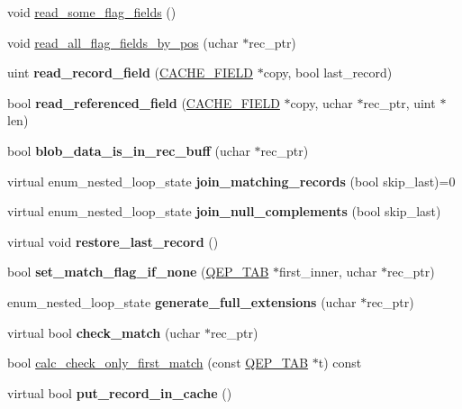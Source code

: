 \begin{DoxyCompactItemize}
void \mbox{\hyperlink{group__Query__Optimizer_gafa19cecc5eccee0ff1285c62769daf39}{read\+\_\+some\+\_\+flag\+\_\+fields}} ()
\item 
void \mbox{\hyperlink{group__Query__Optimizer_ga812222f5f9eb4a9026c8ce89069ef8d7}{read\+\_\+all\+\_\+flag\+\_\+fields\+\_\+by\+\_\+pos}} (uchar $\ast$rec\+\_\+ptr)
\item 
uint {\bfseries read\+\_\+record\+\_\+field} (\mbox{\hyperlink{structst__cache__field}{C\+A\+C\+H\+E\+\_\+\+F\+I\+E\+LD}} $\ast$copy, bool last\+\_\+record)
\item 
bool {\bfseries read\+\_\+referenced\+\_\+field} (\mbox{\hyperlink{structst__cache__field}{C\+A\+C\+H\+E\+\_\+\+F\+I\+E\+LD}} $\ast$copy, uchar $\ast$rec\+\_\+ptr, uint $\ast$len)
\item 
\mbox{\label{classJOIN__CACHE_a25358a8afe91adf6aceb43f246d82b36}} 
bool {\bfseries blob\+\_\+data\+\_\+is\+\_\+in\+\_\+rec\+\_\+buff} (uchar $\ast$rec\+\_\+ptr)
\item 
\mbox{\label{classJOIN__CACHE_a85d4345aed8f6ab7651f8cc0e228b307}} 
virtual enum\+\_\+nested\+\_\+loop\+\_\+state {\bfseries join\+\_\+matching\+\_\+records} (bool skip\+\_\+last)=0
\item 
virtual enum\+\_\+nested\+\_\+loop\+\_\+state {\bfseries join\+\_\+null\+\_\+complements} (bool skip\+\_\+last)
\item 
virtual void {\bfseries restore\+\_\+last\+\_\+record} ()
\item 
bool {\bfseries set\+\_\+match\+\_\+flag\+\_\+if\+\_\+none} (\mbox{\hyperlink{classQEP__TAB}{Q\+E\+P\+\_\+\+T\+AB}} $\ast$first\+\_\+inner, uchar $\ast$rec\+\_\+ptr)
\item 
enum\+\_\+nested\+\_\+loop\+\_\+state {\bfseries generate\+\_\+full\+\_\+extensions} (uchar $\ast$rec\+\_\+ptr)
\item 
virtual bool {\bfseries check\+\_\+match} (uchar $\ast$rec\+\_\+ptr)
\item 
bool \mbox{\hyperlink{group__Query__Optimizer_ga680b1522161dd38adbc48197df3ea115}{calc\+\_\+check\+\_\+only\+\_\+first\+\_\+match}} (const \mbox{\hyperlink{classQEP__TAB}{Q\+E\+P\+\_\+\+T\+AB}} $\ast$t) const
\item 
virtual bool {\bfseries put\+\_\+record\+\_\+in\+\_\+cache} ()
\end{DoxyCompactItemize}
